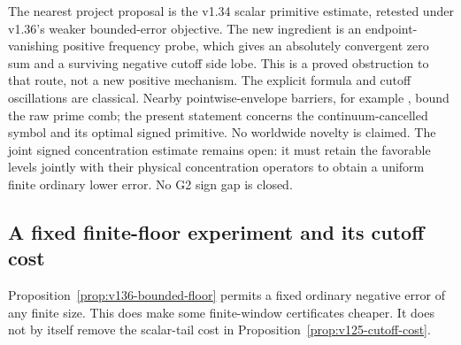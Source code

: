 \documentclass[11pt]{article}
\theoremstyle{remark}
\begin{document}
The nearest project proposal is the v1.34 scalar primitive estimate,
retested under v1.36's weaker bounded-error objective. The new ingredient
is an endpoint-vanishing positive frequency probe, which gives an
absolutely convergent zero sum and a surviving negative cutoff side lobe.
This is a proved obstruction to that route, not a new positive mechanism.
The explicit formula and cutoff oscillations are classical. Nearby
pointwise-envelope barriers, for example \cite{Zhu2026}, bound the raw
prime comb; the present statement concerns the continuum-cancelled
symbol and its optimal signed primitive. No worldwide novelty is claimed.
The joint signed concentration estimate remains open: it must retain
the favorable levels jointly with their physical concentration operators
to obtain a uniform finite ordinary lower error. No G2 sign gap is closed.


\subsection*{A fixed finite-floor experiment and its cutoff cost}

Proposition~\ref{prop:v136-bounded-floor} permits a fixed ordinary
negative error of any finite size. This does make some finite-window
certificates cheaper. It does not by itself remove the scalar-tail
cost in Proposition~\ref{prop:v125-cutoff-cost}.
\end{document}
